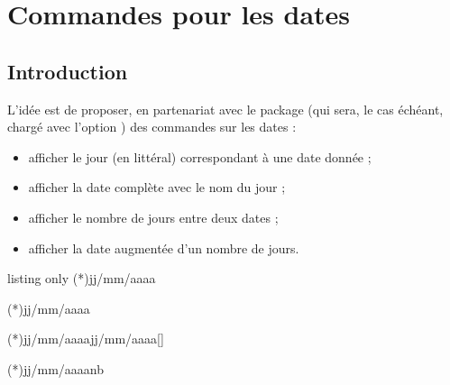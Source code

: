 \begin{PresCodeTexPL}{}
%
%
\end{PresCodeTexPL}

\begin{PresCodeTexPL}{}
\end{PresCodeTexPL}

\pagebreak

\section{Commandes pour les dates}\label{dates}

\subsection{Introduction}

\begin{tipblock}
 L'idée est de proposer, en partenariat avec le package  (qui sera, le cas échéant, chargé avec l'option \ctex{[fr-FR]}) des commandes sur les dates :

\begin{itemize}
	\item afficher le jour (en littéral) correspondant à une date donnée ;
	\item afficher la date complète avec le nom du jour ;
	\item afficher le nombre de jours entre deux dates ;
	\item afficher la date augmentée d'un nombre de jours.
\end{itemize}
\vspace*{-\baselineskip}\leavevmode
\end{tipblock}

\begin{PresCodeTexPL}{listing only}
\JourSelonDate(*){jj/mm/aaaa}

\DateComplete(*){jj/mm/aaaa}

\NbJoursEntreDates(*){jj/mm/aaaa}{jj/mm/aaaa}[\macro]

\AjoutJoursDate(*){jj/mm/aaaa}{nb}
\end{PresCodeTexPL}

